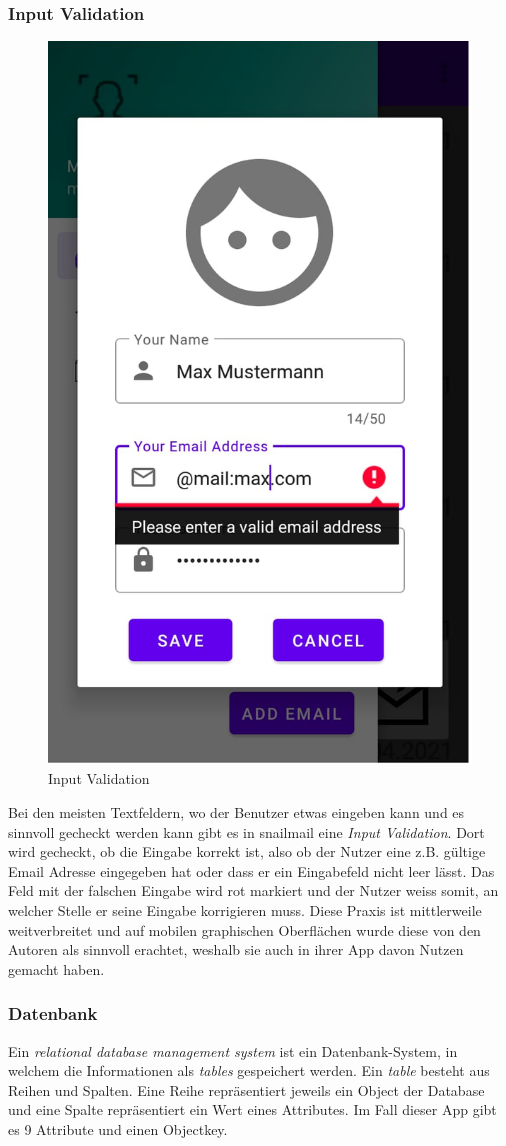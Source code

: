 \documentclass[a4paper,11pt]{article}
\begin{document}
\subsubsection{Input Validation}

\begin{figure}
\centering
\includegraphics[width=.18\textwidth]{media/inputValidation.png}
\caption{Input Validation}
\end{figure}

Bei den meisten Textfeldern, wo der Benutzer etwas eingeben kann und es sinnvoll gecheckt werden kann gibt es in snailmail eine \textit{Input Validation}. Dort wird gecheckt, ob die Eingabe korrekt ist, also ob der Nutzer eine z.B. gültige Email Adresse eingegeben hat oder dass er ein Eingabefeld nicht leer lässt. Das Feld mit der falschen Eingabe wird rot markiert und der Nutzer weiss somit, an welcher Stelle er seine Eingabe korrigieren muss. Diese Praxis ist mittlerweile weitverbreitet und auf mobilen graphischen Oberflächen wurde diese von den Autoren als sinnvoll erachtet, weshalb sie auch in ihrer App davon Nutzen gemacht haben.

\subsubsection{Datenbank}


Ein \textit{relational database management system} ist ein Datenbank-System, in welchem die Informationen als \textit{tables} gespeichert werden. 
Ein \textit{table} besteht aus Reihen und Spalten. Eine Reihe repräsentiert jeweils ein Object der Database und eine Spalte repräsentiert ein Wert eines Attributes. Im Fall dieser App
gibt es 9 Attribute und einen Objectkey. \cite{riccardi2001} \\
\end{document}
